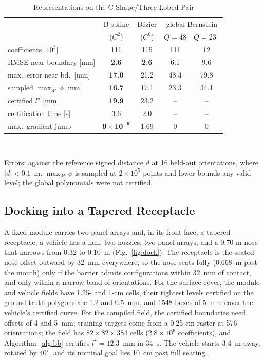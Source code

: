 \documentclass[journal]{IEEEtran}
\theoremstyle{definition}
\newcommand{\Mset}{\mathcal{M}}
\begin{document}
\begin{table}[t]
\caption{Representations on the C-Shape/Three-Lobed Pair}
\label{tab:repr}
\centering
\footnotesize
\setlength{\tabcolsep}{2.5pt}
\renewcommand{\arraystretch}{1.05}
\begin{tabular}{lcccc}
\toprule
& B-spline & B\'ezier & \multicolumn{2}{c}{global Bernstein}\\
& ($C^2$) & ($C^0$) & $Q{=}48$ & $Q{=}23$~\cite{jo2026geometry}\\
\midrule
coefficients [$10^3$] & 111 & 115 & 111 & 12\\
RMSE near boundary [mm] & \textbf{2.6} & \textbf{2.6} & 6.1 & 9.6\\
max.\ error near bd.\ [mm] & \textbf{17.0} & 21.2 & 48.4 & 79.8\\
sampled $\max_{\Mset}\phi$ [mm] & \textbf{16.7} & 17.1 & 23.3 & 34.1\\
certified $l^\star$ [mm] & \textbf{19.9} & 23.2 & -- & --\\
certification time [s] & 3.6 & 2.0 & -- & --\\
max.\ gradient jump & $\mathbf{9{\times}10^{-6}}$ & 1.69 & 0 & 0\\
\bottomrule
\end{tabular}
\\[3pt]
\parbox{\columnwidth}{\footnotesize Errors: against the reference signed distance $d$ at 16 held-out
orientations, where $|d|<0.1$~m.
$\max_{\Mset}\phi$ is sampled at $2\times10^5$ points and lower-bounds any valid level; the global
polynomials were not certified.}
\end{table}

\subsection{Docking into a Tapered Receptacle}\label{sec:exp-dock}
A fixed module carries two panel arrays and, in its front face, a tapered receptacle; a vehicle
has a hull, two nozzles, two panel arrays, and a 0.70-m nose that narrows from 0.32 to 0.10~m
(Fig.~\ref{fig:dock}). The receptacle is the seated nose offset outward by 32~mm everywhere, so the
nose seats fully (0.668~m past the mouth) only if the barrier admits configurations within 32~mm of
contact, and only within a narrow band of orientations. For the surface cover, the module and vehicle
fields have 1.25- and 1-cm cells, their tightest levels certified on the ground-truth polygons are
1.2 and 0.5~mm, and 1548 boxes of 5~mm cover the vehicle's certified curve. For the compiled field,
the certified boundaries need offsets of 4 and 5~mm; training targets come from a 0.25-cm raster at
576 orientations; the field has $82\times82\times384$ cells ($2.8\times10^6$ coefficients), and
Algorithm~\ref{alg:bb} certifies $l^\star=12.3$~mm in 34~s. The vehicle starts 3.4~m away, rotated
by $40^\circ$, and its nominal goal lies 10~cm past full seating.
\end{document}
